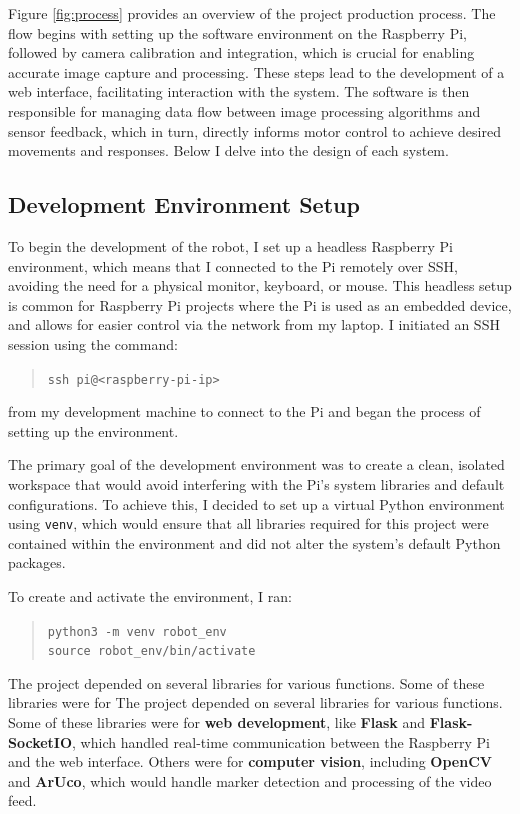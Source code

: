 Figure \ref{fig:process} provides an overview of the project production process. The flow begins with setting up the software environment on the Raspberry Pi, followed by camera calibration and integration, which is crucial for enabling accurate image capture and processing. These steps lead to the development of a web interface, facilitating interaction with the system. The software is then responsible for managing data flow between image processing algorithms and sensor feedback, which in turn, directly informs motor control to achieve desired movements and responses. Below I delve into the design of each system.

\subsection{Development Environment Setup}

To begin the development of the robot, I set up a headless Raspberry Pi environment, which means that I connected to the Pi remotely over SSH, avoiding the need for a physical monitor, keyboard, or mouse. This headless setup is common for Raspberry Pi projects where the Pi is used as an embedded device, and allows for easier control via the network from my laptop. I initiated an SSH session using the command:

\begin{quote}
	\texttt{ssh pi@<raspberry-pi-ip>}
\end{quote}

from my development machine to connect to the Pi and began the process of setting up the environment.

The primary goal of the development environment was to create a clean, isolated workspace that would avoid interfering with the Pi’s system libraries and default configurations. To achieve this, I decided to set up a virtual Python environment using \texttt{venv}, which would ensure that all libraries required for this project were contained within the environment and did not alter the system’s default Python packages.

To create and activate the environment, I ran:

\begin{quote}
	\texttt{python3 -m venv robot\_env} \\
	\texttt{source robot\_env/bin/activate}
\end{quote}

The project depended on several libraries for various functions. Some of these libraries were for The project depended on several libraries for various functions. Some of these libraries were for \textbf{web development}, like \textbf{Flask} and \textbf{Flask-SocketIO}, which handled real-time communication between the Raspberry Pi and the web interface. Others were for \textbf{computer vision}, including \textbf{OpenCV} and \textbf{ArUco}, which would handle marker detection and processing of the video feed.


